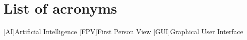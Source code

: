 \chapter*{List of acronyms}
\begin{acronym} 
    [AI]{Artificial Intelligence}
    [FPV]{First Person View}
    [GUI]{Graphical User Interface}
\end{acronym}